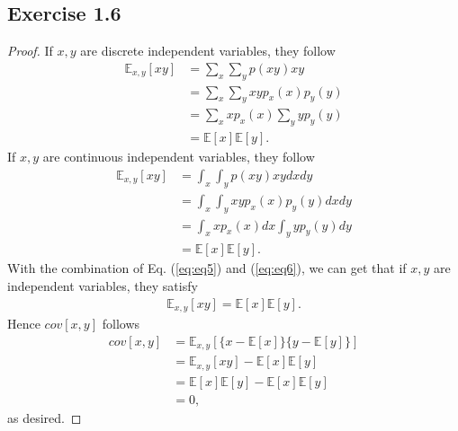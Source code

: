 \documentclass[11pt]{article}
\theoremstyle{definition}
\begin{document}
\subsection{Exercise 1.6}
\begin{proof}
If $x, y$ are discrete independent variables, they follow
\begin{align}
\mathbb{E}_{x,y}[xy] &= \sum_{x}\sum_{y}p(xy)xy \nonumber\\
&= \sum_{x}\sum_{y}xyp_x(x)p_y(y) \nonumber\\
&= \sum_{x}xp_x(x)\sum_{y}yp_y(y) \nonumber\\
&= \mathbb{E}[x]\mathbb{E}[y]. \label{eq:eq5}
\end{align}
If $x, y$ are continuous independent variables, they follow
\begin{align}
\mathbb{E}_{x,y}[xy] &= \int_{x}\int_{y}p(xy)xydxdy \nonumber\\
&= \int_{x}\int_{y}xyp_x(x)p_y(y)dxdy \nonumber\\
&= \int_{x}xp_x(x)dx\int_{y}yp_y(y)dy \nonumber\\
&= \mathbb{E}[x]\mathbb{E}[y]. \label{eq:eq6}
\end{align}
With the combination of Eq. (\ref{eq:eq5}) and (\ref{eq:eq6}), we can get that if $x, y$ are independent variables, they satisfy
\begin{align}
\mathbb{E}_{x,y}[xy] = \mathbb{E}[x]\mathbb{E}[y]. \nonumber
\end{align}
Hence $cov[x, y]$ follows
\begin{equation*}
\begin{aligned}
cov[x, y] &= \mathbb{E}_{x,y}\left[\{x-\mathbb{E}[x]\}\{y-\mathbb{E}[y]\}\right] \\
&= \mathbb{E}_{x,y}[xy] - \mathbb{E}[x]\mathbb{E}[y] \\
&= \mathbb{E}[x]\mathbb{E}[y] - \mathbb{E}[x]\mathbb{E}[y] \\
&= 0,
\end{aligned}
\end{equation*}
as desired.
\end{proof}
\end{document}

